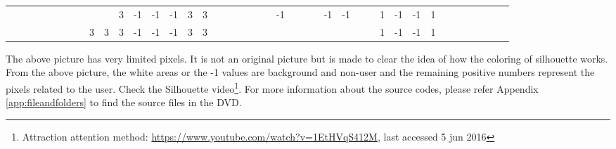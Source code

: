 \begin{table}[H]
{\begin{tabular}{ccccccccccccccccccccccccccccccccccccccccc}
   &    &                           &                           &                           &                           &                           &                           &                           &                           & \cellcolor[HTML]{3531FF}3 & -1                        & -1                        & -1                        & \cellcolor[HTML]{3531FF}3 & \cellcolor[HTML]{3531FF}3 &                           &                           &                           &                           &                           &                           & -1                        &    &    &    & -1                        & -1                        &                           &                           & \cellcolor[HTML]{329A9D}1 & -1                        & -1                        & \cellcolor[HTML]{329A9D}1 &                           &                           &                           &                           &  &  &  \\
   &    &                           &                           &                           &                           &                           &                           & \cellcolor[HTML]{3531FF}3 & \cellcolor[HTML]{3531FF}3 & \cellcolor[HTML]{3531FF}3 & -1                        & -1                        & -1                        & \cellcolor[HTML]{3531FF}3 & \cellcolor[HTML]{3531FF}3 &                           &                           &                           &                           &                           &                           &                           &    &    &    &                           &                           &                           &                           & \cellcolor[HTML]{329A9D}1 & -1                        & -1                        & \cellcolor[HTML]{329A9D}1 &                           &                           &                           &                           &  &  & 
\end{tabular}
}
\end{table}

The above picture has very limited pixels. It is not an original picture but is made to clear the idea of how the coloring of silhouette works. From the above picture, the white areas or the -1 values are background and non-user and the remaining positive numbers represent the pixels related to the user.
Check the Silhouette video\footnote{Attraction attention method: \url{https://www.youtube.com/watch?v=1EtHVqS412M}, last accessed 5 jun 2016}. For more information about the source codes, please refer Appendix \ref{app:fileandfolders} to find the source files in the DVD.



